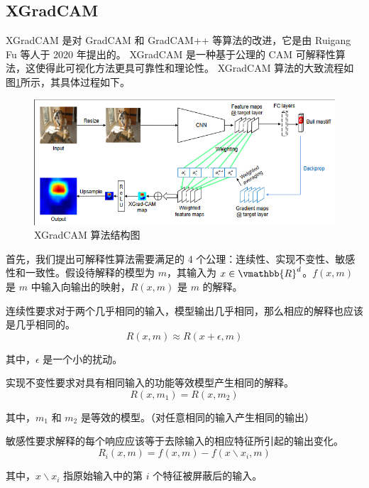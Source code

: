 \documentclass[supercite]{Experimental_Report}
\theoremstyle{definition}
\begin{document}
\subsection{XGradCAM}
XGradCAM\cite{XGradCAM} 是对 GradCAM 和 GradCAM++ 等算法的改进，它是由 Ruigang Fu 等人于 2020 年提出的。
XGradCAM 是一种基于公理的 CAM 可解释性算法，这使得此可视化方法更具可靠性和理论性。
XGradCAM 算法的大致流程如图\ref{XGradCAM}所示，其具体过程如下。
\begin{figure}[H]
	\begin{center}
		\includegraphics[scale=0.8]{../images/XGradCAM算法结构图.png}
		\caption{XGradCAM 算法结构图}
		\label{XGradCAM}
	\end{center}
\end{figure}

首先，我们提出可解释性算法需要满足的 4 个公理：连续性、实现不变性、敏感性和一致性。假设待解释的模型为 $m$，其输入为 $x\in \vmathbb{R}^d$。$f(x,m)$ 是 $m$ 中输入向输出的映射，$R(x,m)$ 是 $m$ 的解释。

连续性要求对于两个几乎相同的输入，模型输出几乎相同，那么相应的解释也应该是几乎相同的。
\begin{equation}
	R(x,m)\approx R(x+\epsilon,m)
\end{equation}

其中，$\epsilon$ 是一个小的扰动。

实现不变性要求对具有相同输入的功能等效模型产生相同的解释。
\begin{equation}
	R(x,m_1)=R(x,m_2)
\end{equation}

其中，$m_1$ 和 $m_2$ 是等效的模型。（对任意相同的输入产生相同的输出）

敏感性要求解释的每个响应应该等于去除输入的相应特征所引起的输出变化。
\begin{equation}
	R_i(x,m)=f(x,m)-f(x\backslash x_i,m)
\end{equation}

其中，$x\backslash x_i$ 指原始输入中的第 $i$ 个特征被屏蔽后的输入。
\end{document}

